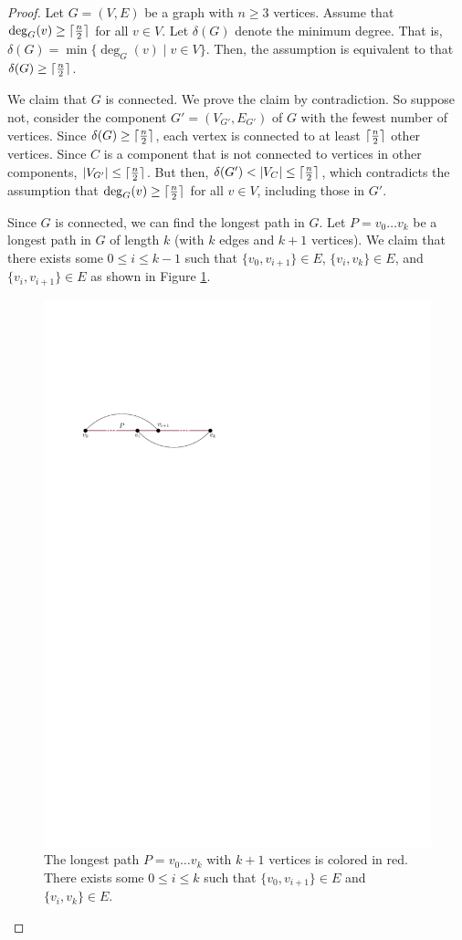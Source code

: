 \begin{proof}
    Let $G = (V,E)$ be a graph with $n \geq 3$ vertices. Assume that $\deg_G(v) \geq \lceil\frac{n}{2}\rceil$ for all $v \in V$. Let $\delta(G)$ denote the minimum degree. That is, $\delta(G) = \min \{\deg_G(v) \mid v \in V\}$. Then, the assumption is equivalent to that $\delta(G) \geq \lceil\frac{n}{2}\rceil$.
    
    We claim that $G$ is connected. We prove the claim by contradiction. So suppose not, consider the component $G' = (V_{G'}, E_{G'})$ of $G$ with the fewest number of vertices. Since $\delta(G) \geq \lceil\frac{n}{2}\rceil$, each vertex is connected to at least $\lceil\frac{n}{2}\rceil$ other vertices. Since $C$ is a component that is not connected to vertices in other components, $|V_{G'}| \leq \lceil\frac{n}{2}\rceil$. But then, $\delta(G') < |V_C| \leq \lceil\frac{n}{2}\rceil$, which contradicts the assumption that $\deg_G(v) \geq \lceil\frac{n}{2}\rceil$ for all $v \in V$, including those in $G'$.

    Since $G$ is connected, we can find the longest path in $G$. Let $P = v_0 \ldots v_k$ be a longest path in $G$ of length $k$ (with $k$ edges and $k+1$ vertices). We claim that there exists some $0 \leq i \leq k-1$ such that $\{v_0,v_{i+1}\} \in E$, $\{v_i, v_k\} \in E$, and $\{v_i, v_{i+1}\} \in E$ as shown in Figure \ref{fig:dirac-thm-path}.

    \begin{figure}[htbp]
        \centering
        \includegraphics[width=0.4\linewidth]{figures/dirac-thm-path.pdf}
        \caption{The longest path $P = v_0\ldots v_k$ with $k+1$ vertices is colored in red. There exists some $0 \leq i \leq k$ such that $\{v_0,v_{i+1}\} \in E$ and $\{v_i,v_k\} \in E$.}
        \label{fig:dirac-thm-path}
    \end{figure}


\end{proof}
